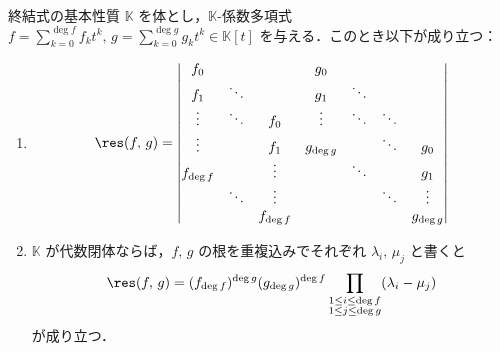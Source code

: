 \documentclass[TQFT_main]{subfiles}
\begin{document}
\begin{myprop}[label=prop:resultant,breakable]{終結式の基本性質}
    $\mathbb{K}$ を体とし，$\mathbb{K}$-係数多項式 $f = \sum_{k=0}^{\deg f} f_k t^k,\, g = \sum_{k=0}^{\deg g} g_k t^k \in \mathbb{K}[t]$ を与える．このとき以下が成り立つ：
    \begin{enumerate}
        \item \begin{align}
            \res (f,\, g) = \mqty|
                f_0     &           &           &g_0        & & &  \\
                f_1     &\ddots     &           &g_1        &\ddots & &  \\
                \vdots  &\ddots     &f_0        &\vdots     &\ddots &\ddots &  \\ 
                \vdots  &           &f_1        &g_{\deg g} &       &\ddots &g_0 \\
                f_{\deg f}&         &\vdots     &           &\ddots &       &g_1 \\
                            &\ddots &\vdots     &           &       &\ddots &\vdots \\
                            &       &f_{\deg f} &           &       &       &g_{\deg g}
            |
        \end{align}
        \item $\mathbb{K}$ が代数閉体ならば，$f,\, g$ の根を重複込みでそれぞれ $\lambda_i,\, \mu_j$ と書くと
        \begin{align}
            \res (f,\, g) = (f_{\deg f})^{\deg g} (g_{\deg g})^{\deg f} \prod_{\substack{1 \le i \le \deg f \\ 1 \le j \le \deg g}} (\lambda_i - \mu_j)
        \end{align}
        が成り立つ．
    \end{enumerate}
\end{myprop}
\end{document}
